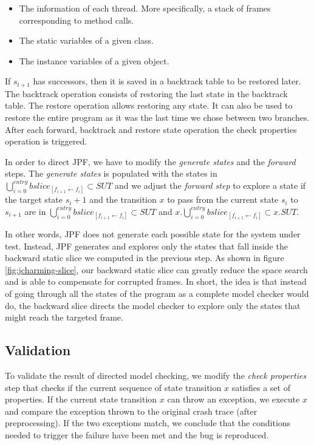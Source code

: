 \documentclass[12pt]{report}
\providecommand{\tightlist}{%
  \setlength{\itemsep}{0pt}\setlength{\parskip}{0pt}}
\begin{document}
\begin{itemize}
\tightlist
\item
  The information of each thread. More specifically, a stack of frames
  corresponding to method calls.
\item
  The static variables of a given class.
\item
  The instance variables of a given object.
\end{itemize}

If \(s_{t+1}\) has successors, then it is saved in a backtrack table to
be restored later. The backtrack operation consists of restoring the
last state in the backtrack table. The restore operation allows
restoring any state. It can also be used to restore the entire program
as it was the last time we chose between two branches. After each
forward, backtrack and restore state operation the check properties
operation is triggered.

In order to direct JPF, we have to modify the \emph{generate states} and
the \emph{forward} steps. The \emph{generate states} is populated with
the states in
\(\bigcup_{i=0}^{entry} bslice_{[f_{i+1} \leftarrow f_i]} \subset SUT\)
and we adjust the \emph{forward step} to explore a state if the target
state \(s_i+1\) and the transition \(x\) to pass from the current state
\(s_i\) to \(s_{i+1}\) are in
\(\bigcup_{i=0}^{entry} bslice_{[f_{i+1} \leftarrow f_i]} \subset SUT\)
and
\(x.\bigcup_{i=0}^{entry} bslice_{[f_{i+1} \leftarrow f_i]} \subset x.SUT\).

In other words, JPF does not generate each possible state for the system
under test. Instead, JPF generates and explores only the states that
fall inside the backward static slice we computed in the previous step.
As shown in figure \ref{fig:jcharming-slice}, our backward static slice
can greatly reduce the space search and is able to compensate for
corrupted frames. In short, the idea is that instead of going through
all the states of the program as a complete model checker would do, the
backward slice directs the model checker to explore only the states that
might reach the targeted frame.

\subsection{Validation}\label{validation}

To validate the result of directed model checking, we modify the
\emph{check properties} step that checks if the current sequence of
state transition \(x\) satisfies a set of properties. If the current
state transition \(x\) can throw an exception, we execute \(x\) and
compare the exception thrown to the original crash trace (after
preprocessing). If the two exceptions match, we conclude that the
conditions needed to trigger the failure have been met and the bug is
reproduced.
\end{document}
